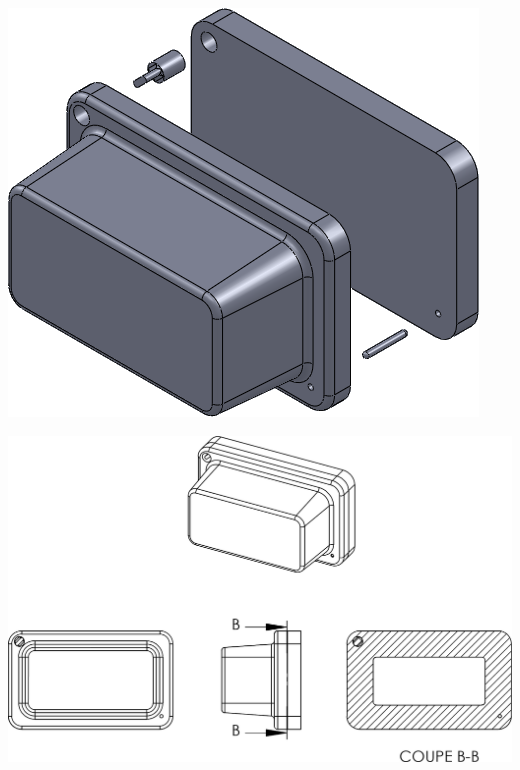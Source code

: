\documentclass[11pt,oneside]{article}
\begin{document}
\noindent\begin{minipage}[c]{.3\linewidth}
\begin{center}
\includegraphics[width=.9\textwidth]{png/PlanPrep_3}
\end{center}
\end{minipage}\hfill
\noindent\begin{minipage}[c]{.65\linewidth}
\begin{center}
\includegraphics[width=\textwidth]{png/PlanPrep_4}
\end{center}
\end{minipage}

\vspace{.5cm}
\end{document}
